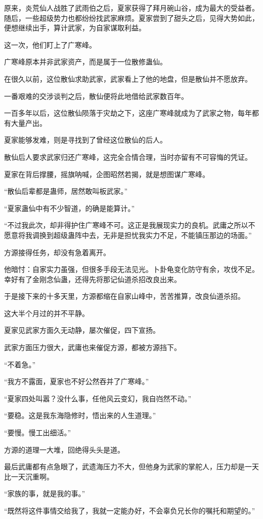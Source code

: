 \begin{this_body}
原来，炎荒仙人战胜了武雨伯之后，夏家获得了拜月碗山谷，成为最大的受益者。随后，一些超级势力也都纷纷找武家麻烦。夏家尝到了甜头之后，见得大势如此，便想继续出手，算计武家，为自家谋取利益。

这一次，他们盯上了广寒峰。

广寒峰原本并非武家资产，而是属于一位散修蛊仙。

在很久以前，这位散仙求助武家，武家看上了他的地盘，但是散仙并不愿放弃。

一番艰难的交涉谈判之后，散仙便将此地借给武家数百年。

一百多年以后，这位散仙陨落于灾劫之下，这座广寒峰就成为了武家之物，每年都有大量产出。

夏家能够发难，则是寻找到了曾经这位散仙的后人。

散仙后人要求武家归还广寒峰，这完全合情合理，当时亦留有不可容悔的凭证。

夏家在背后撑腰，摇旗呐喊，企图昭然若揭，就是想图谋广寒峰。

“散仙后辈都是蛊师，居然敢叫板武家。”

“夏家蛊仙中有不少智道，的确是能算计。”

“不过我此次，却非得护住广寒峰不可。这正是我展现实力的良机。武庸之所以不愿意将我调换到超级蛊阵中去，无非是担忧我实力不足，不能镇压那边的场面。”

方源接得任务，却没有急着离开。

他暗忖：自家实力虽强，但很多手段无法见光。卜卦龟变化防守有余，攻伐不足。幸好有了金刚念仙蛊，还得先将那记仙道杀招改良出来。

于是接下来的十多天里，方源都缩在自家山峰中，苦苦推算，改良仙道杀招。

这大半个月过的并不平静。

夏家见武家方面久无动静，屡次催促，四下宣扬。

武家方面压力很大，武庸也来催促方源，都被方源挡下。

“不着急。”

“我方不露面，夏家也不好公然吞并了广寒峰。”

“夏家四处叫嚣？没什么事，任他风云变幻，我自岿然不动。”

“要稳。这是我东海隐修时，悟出来的人生道理。”

“要慢。慢工出细活。”

方源的道理一大堆，回绝得头头是道。

最后武庸都有点急眼了，武遗海压力不大，但他身为武家的掌舵人，压力却是一天比一天沉重啊。

“家族的事，就是我的事。”

“既然将这件事情交给我了，我就一定能办好，不会辜负兄长你的嘱托和期望的。”


\end{this_body}
